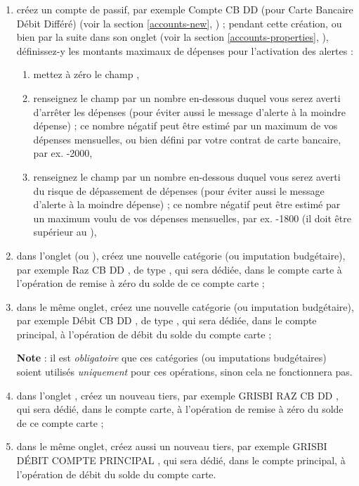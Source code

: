 \begin{enumerate}
	\item créez un compte de passif, par exemple \og Compte CB DD \fg{} (pour Carte Bancaire Débit Différé) (voir la section \vref{accounts-new}, ) ; pendant cette création, ou bien par la suite dans son onglet (voir la section \vref{accounts-properties}, ), définissez-y les montants maximaux de dépenses pour l'activation des alertes : 
		\begin{enumerate}
			 \item mettez à zéro le champ ,
			 \item renseignez le champ  par un nombre en-dessous duquel vous serez averti d'arrêter les dépenses (pour éviter aussi le message d'alerte \og {} \fg{} à la moindre dépense) ; ce nombre négatif peut être estimé par un maximum de vos dépenses mensuelles, ou bien défini par votre contrat de carte bancaire, par ex. -2000,
			 \item renseignez le champ  par un nombre en-dessous duquel vous serez averti du risque de dépassement de dépenses (pour éviter aussi le message d'alerte \og {} \fg{} à la moindre dépense) ; ce nombre négatif peut être estimé par un maximum voulu de vos dépenses mensuelles, par ex. -1800 (il doit être supérieur au ),	
		\end{enumerate}
	\item dans l'onglet  (ou ), créez une nouvelle catégorie  (ou imputation budgétaire), par exemple \og Raz CB DD \fg{}, de type , qui sera dédiée, dans le compte carte à l'opération de remise à zéro du solde de ce compte carte ;
	\item dans le même onglet, créez une nouvelle catégorie (ou imputation budgétaire), par exemple \og Débit CB DD \fg{}, de type , qui sera dédiée, dans le compte principal, à l'opération de débit du solde du compte carte ;

	\textbf{Note} : il est \emph{obligatoire} que ces catégories (ou imputations budgétaires) soient utilisés \emph{uniquement} pour ces opérations, sinon cela ne fonctionnera pas.		
	\item dans l'onglet , créez un nouveau tiers, par exemple \og GRISBI RAZ CB DD \fg{}, qui sera  dédié, dans le compte carte,  à l'opération de remise à zéro du solde de ce compte carte ; 
	\item dans le même onglet, créez aussi un nouveau tiers, par exemple \og GRISBI DÉBIT COMPTE PRINCIPAL \fg{}, qui sera  dédié, dans le compte principal, à l'opération de débit du solde du compte carte.


\end{enumerate}
